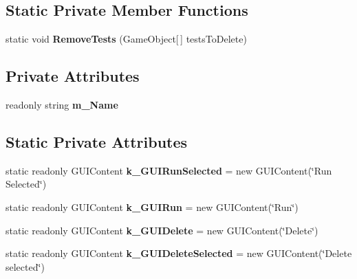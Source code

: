 \subsection*{Static Private Member Functions}
\begin{DoxyCompactItemize}
\item 
\mbox{\label{class_unity_test_1_1_integration_test_renderer_base_a73fce11164850a3db0d3a090148547a4}} 
static void {\bfseries Remove\+Tests} (Game\+Object\mbox{[}$\,$\mbox{]} tests\+To\+Delete)
\end{DoxyCompactItemize}
\subsection*{Private Attributes}
\begin{DoxyCompactItemize}
\item 
\mbox{\label{class_unity_test_1_1_integration_test_renderer_base_aa1f628c4ae4f16af53805cdb229fbd23}} 
readonly string {\bfseries m\+\_\+\+Name}
\end{DoxyCompactItemize}
\subsection*{Static Private Attributes}
\begin{DoxyCompactItemize}
\item 
\mbox{\label{class_unity_test_1_1_integration_test_renderer_base_a25079a736d04a9a39f3b7c3beb7fe0ee}} 
static readonly G\+U\+I\+Content {\bfseries k\+\_\+\+G\+U\+I\+Run\+Selected} = new G\+U\+I\+Content(\char`\"{}Run Selected\char`\"{})
\item 
\mbox{\label{class_unity_test_1_1_integration_test_renderer_base_a3799f24b5c84c49a87355f66ccdfbff6}} 
static readonly G\+U\+I\+Content {\bfseries k\+\_\+\+G\+U\+I\+Run} = new G\+U\+I\+Content(\char`\"{}Run\char`\"{})
\item 
\mbox{\label{class_unity_test_1_1_integration_test_renderer_base_a1279113ad1805166f9535d98569938ef}} 
static readonly G\+U\+I\+Content {\bfseries k\+\_\+\+G\+U\+I\+Delete} = new G\+U\+I\+Content(\char`\"{}Delete\char`\"{})
\item 
\mbox{\label{class_unity_test_1_1_integration_test_renderer_base_a3dfe5920cdceb25c616df79a8c94ae42}} 
static readonly G\+U\+I\+Content {\bfseries k\+\_\+\+G\+U\+I\+Delete\+Selected} = new G\+U\+I\+Content(\char`\"{}Delete selected\char`\"{})
\end{DoxyCompactItemize}


